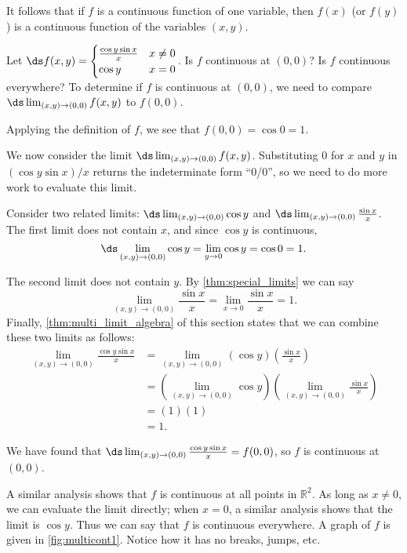 It follows that if $f$ is a continuous function of one variable, then $f(x)$ (or $f(y)$) is a continuous function of the variables $(x,y)$.

\begin{example}\label{ex_multicont1}%
Let $\ds f(x,y) = \begin{cases} \frac{\cos y\sin x}{x} & x\neq 0 \\
	\cos y & x=0
	\end{cases}$. Is $f$ continuous at $(0,0)$? Is $f$ continuous everywhere?
\solution
To determine if $f$ is continuous at $(0,0)$, we need to compare $\ds\lim_{(x,y)\to (0,0)} f(x,y)$ to $f(0,0)$. 

Applying the definition of $f$, we see that $f(0,0) = \cos 0 = 1$. 

We now consider the limit $\ds \lim_{(x,y)\to (0,0)} f(x,y)$. Substituting $0$ for $x$ and $y$ in $(\cos y\sin x)/x$ returns the indeterminate form ``0/0'', so we need to do more work to evaluate this limit.

Consider two related limits: $\ds \lim_{(x,y)\to (0,0)} \cos y$ and $\ds \lim_{(x,y)\to(0,0)} \frac{\sin x}x$. The first limit does not contain $x$, and since $\cos y$ is continuous,
\[\ds \lim_{(x,y)\to (0,0)} \cos y =\lim_{y\to 0} \cos y = \cos 0 = 1.\]

The second limit does not contain $y$. By \autoref{thm:special_limits} we can say
\[\lim_{(x,y)\to (0,0)} \frac{\sin x}{x} = \lim_{x\to 0} \frac{\sin x}{x} = 1.\]
Finally, \autoref{thm:multi_limit_algebra} of this section states that we can combine these two limits as follows:
\begin{align*}
\lim_{(x,y)\to (0,0)} \frac{\cos y\sin x}{x} &= \lim_{(x,y)\to (0,0)} (\cos y)\left(\frac{\sin x}{x}\right) \\ 
&=\left(\lim_{(x,y)\to (0,0)} \cos y\right)\left(\lim_{(x,y)\to (0,0)} \frac{\sin x}{x}\right) \\
  &= (1)(1)\\
	&=1.
\end{align*}

We have found that $\ds \lim_{(x,y)\to (0,0)} \frac{\cos y\sin x}{x} = f(0,0)$, so $f$ is continuous at $(0,0)$.


A similar analysis shows that $f$ is continuous at all points in $\mathbb{R}^2$. As long as $x\neq0$, we can evaluate the limit directly; when $x=0$, a similar analysis shows that the limit is $\cos y$. Thus we can say that $f$ is continuous everywhere. A graph of $f$ is given in \autoref{fig:multicont1}. Notice how it has no breaks, jumps, etc.
\end{example}

